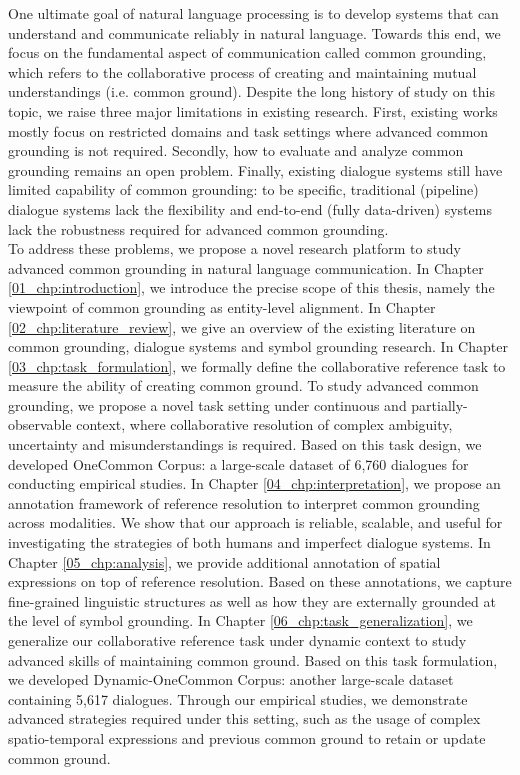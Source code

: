 \documentclass[doctor,11pt,final]{iscs-thesis}
\date{June 4, 2021}
\begin{document}
\begin{eabstract}

\begin{spacing}{1.1}
{\normalsize
One ultimate goal of natural language processing is to develop systems that can understand and communicate reliably in natural language. Towards this end, we focus on the fundamental aspect of communication called common grounding, which refers to the collaborative process of creating and maintaining mutual understandings (i.e. common ground). Despite the long history of study on this topic, we raise three major limitations in existing research. First, existing works mostly focus on restricted domains and task settings where advanced common grounding is not required. Secondly, how to evaluate and analyze common grounding remains an open problem. Finally, existing dialogue systems still have limited capability of common grounding: to be specific, traditional (pipeline) dialogue systems lack the flexibility and end-to-end (fully data-driven) systems lack the robustness required for advanced common grounding.\\
\indent To address these problems, we propose a novel research platform to study advanced common grounding in natural language communication. In Chapter \ref{01_chp:introduction}, we introduce the precise scope of this thesis, namely the viewpoint of common grounding as entity-level alignment. In Chapter \ref{02_chp:literature_review}, we give an overview of the existing literature on common grounding, dialogue systems and symbol grounding research. In Chapter \ref{03_chp:task_formulation}, we formally define the collaborative reference task to measure the ability of creating common ground. To study advanced common grounding, we propose a novel task setting under continuous and partially-observable context, where collaborative resolution of complex ambiguity, uncertainty and misunderstandings is required. Based on this task design, we developed OneCommon Corpus: a large-scale dataset of 6,760 dialogues for conducting empirical studies. In Chapter \ref{04_chp:interpretation}, we propose an annotation framework of reference resolution to interpret common grounding across modalities. We show that our approach is reliable, scalable, and useful for investigating the strategies of both humans and imperfect dialogue systems. In Chapter \ref{05_chp:analysis}, we provide additional annotation of spatial expressions on top of reference resolution. Based on these annotations, we capture fine-grained linguistic structures as well as how they are externally grounded at the level of symbol grounding. In Chapter \ref{06_chp:task_generalization}, we generalize our collaborative reference task under dynamic context to study advanced skills of maintaining common ground. Based on this task formulation, we developed Dynamic-OneCommon Corpus: another large-scale dataset containing 5,617 dialogues. Through our empirical studies, we demonstrate advanced strategies required under this setting, such as the usage of complex spatio-temporal expressions and previous common ground to retain or update common ground.\\
}
\end{spacing}
\end{eabstract}
\end{document}
